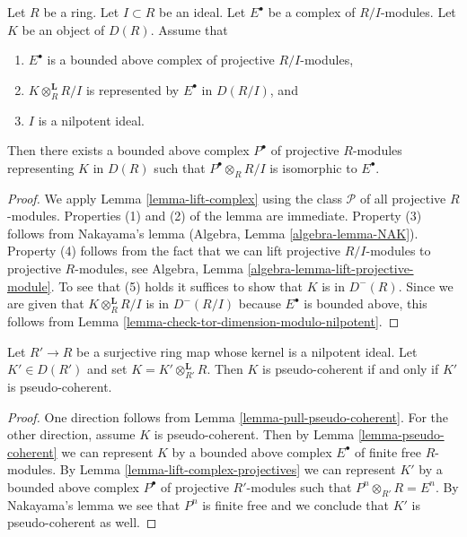 \begin{lemma}
\label{lemma-lift-complex-projectives}
Let $R$ be a ring. Let $I \subset R$ be an ideal. Let $E^\bullet$
be a complex of $R/I$-modules. Let $K$ be an object of $D(R)$. Assume that
\begin{enumerate}
\item $E^\bullet$ is a bounded above complex of projective $R/I$-modules,
\item $K \otimes_R^\mathbf{L} R/I$ is represented by $E^\bullet$ in
$D(R/I)$, and
\item $I$ is a nilpotent ideal.
\end{enumerate}
Then there exists a bounded above complex $P^\bullet$ of projective
$R$-modules representing $K$ in $D(R)$ such that $P^\bullet \otimes_R R/I$
is isomorphic to $E^\bullet$.
\end{lemma}

\begin{proof}
We apply Lemma \ref{lemma-lift-complex} using the class $\mathcal{P}$
of all projective $R$-modules. Properties (1) and (2) of the lemma
are immediate. Property (3) follows from Nakayama's lemma
(Algebra, Lemma \ref{algebra-lemma-NAK}).
Property (4) follows from the fact that we can lift projective
$R/I$-modules to projective $R$-modules, see
Algebra, Lemma \ref{algebra-lemma-lift-projective-module}.
To see that (5) holds it suffices to show that $K$ is in $D^{-}(R)$.
Since we are given that $K \otimes_R^\mathbf{L} R/I$ is in $D^{-}(R/I)$
because $E^\bullet$ is bounded above, this follows from
Lemma \ref{lemma-check-tor-dimension-modulo-nilpotent}.
\end{proof}

\begin{lemma}
\label{lemma-check-pseudo-coherent-modulo-nilpotent}
Let $R' \to R$ be a surjective ring map whose kernel is a nilpotent ideal.
Let $K' \in D(R')$ and set $K = K' \otimes_{R'}^\mathbf{L} R$.
Then $K$ is pseudo-coherent if and only if $K'$ is pseudo-coherent.
\end{lemma}

\begin{proof}
One direction follows from Lemma \ref{lemma-pull-pseudo-coherent}.
For the other direction, assume $K$ is pseudo-coherent. Then by
Lemma \ref{lemma-pseudo-coherent} we can represent $K$ by a bounded
above complex $E^\bullet$ of finite free $R$-modules. By
Lemma \ref{lemma-lift-complex-projectives} we can represent
$K'$ by a bounded above complex $P^\bullet$ of projective
$R'$-modules such that $P^n \otimes_{R'} R = E^n$.
By Nakayama's lemma we see that $P^n$ is finite free
and we conclude that $K'$ is pseudo-coherent as well.
\end{proof}

